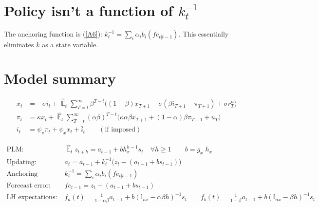 \documentclass[11pt]{article}
\renewcommand{\[}{\begin{equation}}
\renewcommand{\]}{\end{equation}}
\DeclareMathOperator{\E}{\mathbb{E}}
\newcommand\blankpage{%
    \null
    \thispagestyle{empty}%
    \addtocounter{page}{-1}%
    \newpage}
\begin{document}
\clearpage
\section{Policy isn't a function of $k^{-1}_t$}
The anchoring function is (\ref{A6}): $k^{-1}_t  = \sum_i \alpha_i b_i(fe_{t|t-1})$. This essentially eliminates $k$ as a state variable. 



\afterpage{\blankpage}


    \clearpage
\appendix
\section{Model summary}

\vspace{-0.5cm}

\begin{align}
x_t &=  -\sigma i_t +\hat{\E}_t \sum_{T=t}^{\infty} \beta^{T-t }\big( (1-\beta)x_{T+1} - \sigma(\beta i_{T+1} - \pi_{T+1}) +\sigma r_T^n \big)  \label{A1}  \\
\pi_t &= \kappa x_t +\hat{\E}_t \sum_{T=t}^{\infty} (\alpha\beta)^{T-t }\big( \kappa \alpha \beta x_{T+1} + (1-\alpha)\beta \pi_{T+1} + u_T\big) \label{A2}  \\
i_t &= \psi_{\pi}\pi_t + \psi_{x} x_t  + \bar{i}_t \label{TR} \quad \quad (\text{if imposed})
\end{align}

\vspace{-1.2cm}

\begin{align}
\text{PLM:} \quad \quad & \hat{\E}_t z_{t+h}  =  a_{t-1} + bh_x^{h-1}s_t  \quad \forall h\geq 1 \quad \quad b = g_x\; h_x \quad \quad  \label{PLM} \\
\text{Updating:} \quad \quad & a_{t}  =a_{t-1} +k_t^{-1}\big(z_{t} -(a_{t-1}+b s_{t-1}) \big)  \label{A5} \\
\text{Anchoring function:} \quad \quad & k^{-1}_t  = \sum_i \alpha_i b_i(fe_{t|t-1}) \label{A6}\\
\text{Forecast error:} \quad \quad & fe_{t-1}  = z_t - (a_{t-1}+b s_{t-1}) \label{A7} \\
\text{LH expectations:} \quad \quad & f_a(t) = \frac{1}{1-\alpha\beta}a_{t-1}  + b(\mathbb{I}_{nx} - \alpha\beta h)^{-1}s_t \quad \quad  f_b(t) = \frac{1}{1-\beta}a_{t-1}  + b(\mathbb{I}_{nx} - \beta h)^{-1}s_t  \label{A8}
\end{align}
\end{document}
